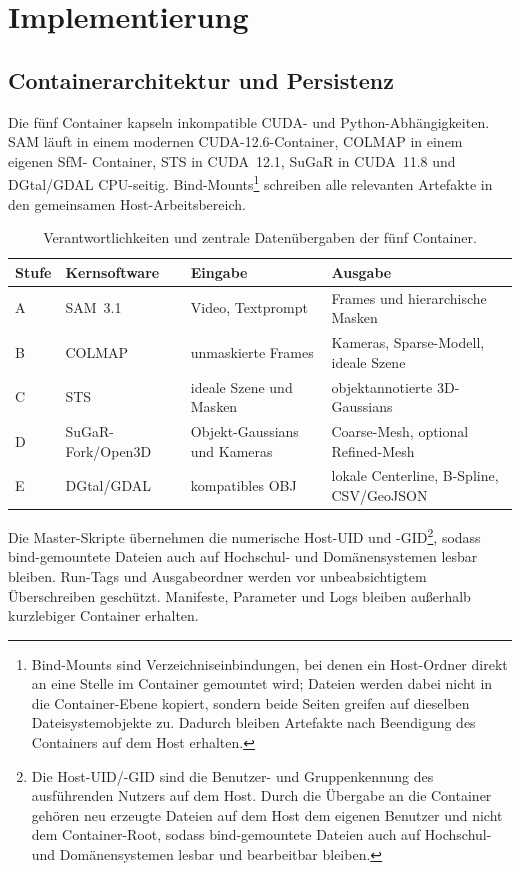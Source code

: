 \section{Implementierung}
\label{sec:implementierung}

\subsection{Containerarchitektur und Persistenz}

Die fünf Container kapseln inkompatible CUDA- und Python-Abhängigkeiten. SAM
läuft in einem modernen CUDA-12.6-Container, COLMAP in einem eigenen SfM-
Container, STS in CUDA~12.1, SuGaR in CUDA~11.8 und DGtal/GDAL CPU-seitig.
Bind-Mounts\footnote{Bind-Mounts sind Verzeichniseinbindungen, bei denen ein
Host-Ordner direkt an eine Stelle im Container gemountet wird; Dateien werden
dabei nicht in die Container-Ebene kopiert, sondern beide Seiten greifen auf
dieselben Dateisystemobjekte zu. Dadurch bleiben Artefakte nach Beendigung
des Containers auf dem Host erhalten.} schreiben alle relevanten Artefakte in
den gemeinsamen Host-Arbeitsbereich.

\begin{table}[H]
\centering
\small
\begin{tabularx}{\textwidth}{p{1.4cm}p{3.4cm}XX}
\toprule
Stufe & Kernsoftware & Eingabe & Ausgabe\\
\midrule
A & SAM~3.1 & Video, Textprompt & Frames und hierarchische Masken\\
B & COLMAP & unmaskierte Frames & Kameras, Sparse-Modell, ideale Szene\\
C & STS & ideale Szene und Masken & objektannotierte 3D-Gaussians\\
D & SuGaR-Fork/Open3D & Objekt-Gaussians und Kameras & Coarse-Mesh,
optional Refined-Mesh\\
E & DGtal/GDAL & kompatibles OBJ & lokale Centerline, B-Spline, CSV/GeoJSON\\
\bottomrule
\end{tabularx}
\caption{Verantwortlichkeiten und zentrale Datenübergaben der fünf Container.}
\label{tab:containerrollen}
\end{table}

Die Master-Skripte übernehmen die numerische Host-UID und -GID\footnote{Die
Host-UID/-GID sind die Benutzer- und Gruppenkennung des ausführenden Nutzers
auf dem Host. Durch die Übergabe an die Container gehören neu erzeugte
Dateien auf dem Host dem eigenen Benutzer und nicht dem Container-Root, sodass
bind-gemountete Dateien auch auf Hochschul- und Domänensystemen lesbar und
bearbeitbar bleiben.}, sodass
bind-gemountete Dateien auch auf Hochschul- und Domänensystemen lesbar bleiben.
Run-Tags und Ausgabeordner werden vor unbeabsichtigtem Überschreiben geschützt.
Manifeste, Parameter und Logs bleiben außerhalb kurzlebiger Container erhalten.


